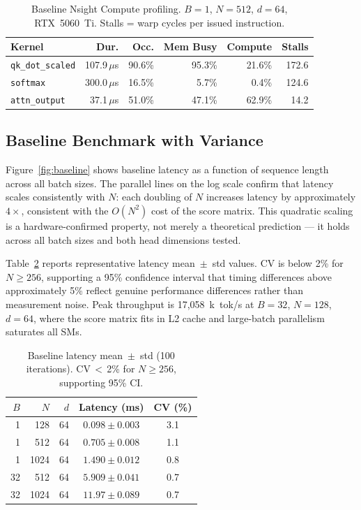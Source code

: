 \documentclass{article}
\begin{document}
\begin{table}[ht]
\caption{Baseline Nsight Compute profiling.
         $B{=}1$, $N{=}512$, $d{=}64$, RTX~5060~Ti.
         Stalls = warp cycles per issued instruction.}
\label{tab:ncu_baseline}
\centering
\small
\begin{tabular}{lrrrrr}
\hline\hline
\textbf{Kernel} & \textbf{Dur.} & \textbf{Occ.}
  & \textbf{Mem Busy} & \textbf{Compute} & \textbf{Stalls} \\
\hline
\texttt{qk\_dot\_scaled} & 107.9\,$\mu$s & 90.6\% & 95.3\% & 21.6\% & 172.6 \\
\texttt{softmax}         & 300.0\,$\mu$s & 16.5\% &  5.7\% &  0.4\% & 124.6 \\
\texttt{attn\_output}    &  37.1\,$\mu$s & 51.0\% & 47.1\% & 62.9\% &  14.2 \\
\hline
\end{tabular}
\end{table}

\subsection{Baseline Benchmark with Variance}

Figure~\ref{fig:baseline} shows baseline latency as a function of sequence
length across all batch sizes. The parallel lines on the log scale confirm
that latency scales consistently with $N$: each doubling of $N$ increases
latency by approximately $4\times$, consistent with the $O(N^2)$ cost of
the score matrix. This quadratic scaling is a hardware-confirmed property,
not merely a theoretical prediction — it holds across all batch sizes and
both head dimensions tested.

Table~\ref{tab:variance} reports representative latency mean~$\pm$~std
values. CV is below 2\% for $N\geq256$, supporting a 95\% confidence
interval that timing differences above approximately 5\% reflect genuine
performance differences rather than measurement noise. Peak throughput is
17,058~k~tok/s at $B{=}32$, $N{=}128$, $d{=}64$, where the score matrix
fits in L2 cache and large-batch parallelism saturates all SMs.

\begin{table}[ht]
\caption{Baseline latency mean~$\pm$~std (100 iterations).
         CV\,$<$\,2\% for $N\geq256$, supporting 95\% CI.}
\label{tab:variance}
\centering
\begin{tabular}{rrrcc}
\hline\hline
$B$ & $N$ & $d$ & Latency (ms) & CV (\%) \\
\hline
 1 & 128  & 64 & $0.098\pm0.003$ & 3.1 \\
 1 & 512  & 64 & $0.705\pm0.008$ & 1.1 \\
 1 & 1024 & 64 & $1.490\pm0.012$ & 0.8 \\
32 & 512  & 64 & $5.909\pm0.041$ & 0.7 \\
32 & 1024 & 64 & $11.97\pm0.089$ & 0.7 \\
\hline
\end{tabular}
\end{table}
\end{document}
